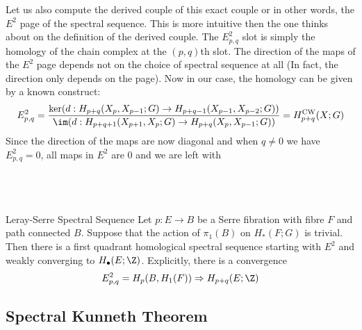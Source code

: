 \documentclass[a4paper]{article}
\begin{document}
Let us also compute the derived couple of this exact couple or in other words, the $E^2$ page of the spectral sequence. This is more intuitive then the one thinks about on the definition of the derived couple. The $E_{p,q}^2$ slot is simply the homology of the chain complex at the $(p,q)$th slot. The direction of the maps of the $E^2$ page depends not on the choice of spectral sequence at all (In fact, the direction only depends on the page). Now in our case, the homology can be given by a known construct: $$E_{p,q}^2=\frac{\ker(d:H_{p+q}(X_p,X_{p-1};G)\to H_{p+q-1}(X_{p-1},X_{p-2};G))}{\im(d:H_{p+q+1}(X_{p+1},X_p;G)\to H_{p+q}(X_p,X_{p-1};G))}=H_{p+q}^\text{CW}(X;G)$$ Since the direction of the maps are now diagonal and when $q\neq 0$ we have $E_{p,q}^2=0$, all maps in $E^2$ are $0$ and we are left with \\~\\
\\~\\

\begin{thm}{Leray-Serre Spectral Sequence}{} Let $p:E\to B$ be a Serre fibration with fibre $F$ and path connected $B$. Suppose that the action of $\pi_1(B)$ on $H_\ast(F;G)$ is trivial. Then there is a first quadrant homological spectral sequence starting with $E^2$ and weakly converging to $H_\bullet(E;\Z)$. Explicitly, there is a convergence $$E_{p,q}^2=H_p(B,H_1(F))\Rightarrow H_{p+q}(E;\Z)$$
\end{thm}

\subsection{Spectral Kunneth Theorem}
\end{document}
